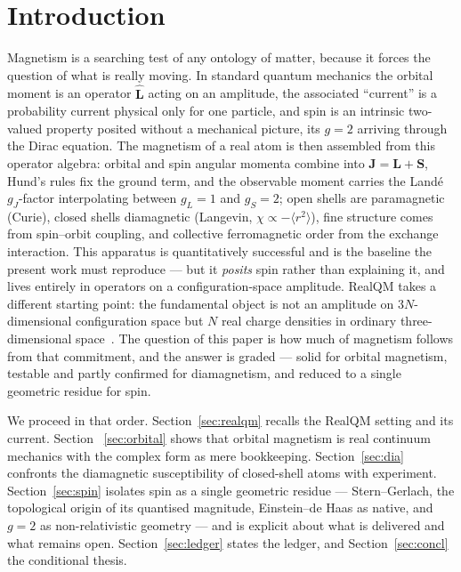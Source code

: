\documentclass[11pt]{article}
\begin{document}
\section{Introduction}
\label{sec:intro}

Magnetism is a searching test of any ontology of matter, because it forces the question of what is really moving.
In standard quantum mechanics the orbital moment is an operator $\hat{\mathbf L}$ acting on an amplitude, the
associated ``current'' is a probability current physical only for one particle, and spin is an intrinsic
two-valued property posited without a mechanical picture, its $g=2$ arriving through the Dirac equation. The
magnetism of a real atom is then assembled from this operator algebra: orbital and spin angular momenta combine
into $\mathbf J=\mathbf L+\mathbf S$, Hund's rules fix the ground term, and the observable moment carries the
Land\'e $g_J$-factor interpolating between $g_L=1$ and $g_S=2$; open shells are paramagnetic (Curie), closed
shells diamagnetic (Langevin, $\chi\propto-\langle r^2\rangle$), fine structure comes from spin--orbit coupling,
and collective ferromagnetic order from the exchange interaction. This apparatus is quantitatively successful and
is the baseline the present work must reproduce --- but it \emph{posits} spin rather than explaining it, and lives
entirely in operators on a configuration-space amplitude. RealQM takes a different starting point: the fundamental object is not an amplitude on $3N$-dimensional configuration
space but $N$ real charge densities in ordinary three-dimensional space~\cite{RealQM}. The question of this paper
is how much of magnetism follows from that commitment, and the answer is graded --- solid for orbital magnetism,
testable and partly confirmed for diamagnetism, and reduced to a single geometric residue for spin.

We proceed in that order. Section~\ref{sec:realqm} recalls the RealQM setting and its current. Section~%
\ref{sec:orbital} shows that orbital magnetism is real continuum mechanics with the complex form as mere
bookkeeping. Section~\ref{sec:dia} confronts the diamagnetic susceptibility of closed-shell atoms with
experiment. Section~\ref{sec:spin} isolates spin as a single geometric residue --- Stern--Gerlach, the topological
origin of its quantised magnitude, Einstein--de Haas as native, and $g=2$ as non-relativistic geometry --- and is
explicit about what is delivered and what remains open. Section~\ref{sec:ledger} states the ledger, and
Section~\ref{sec:concl} the conditional thesis.
\end{document}
